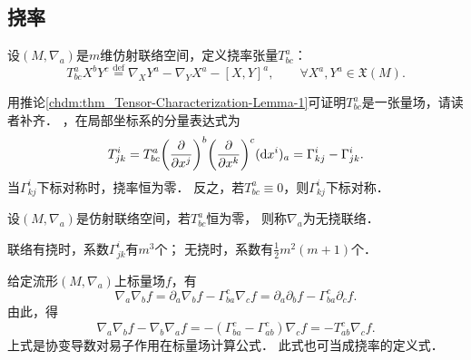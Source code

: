 \subsection{挠率}\label{chccr:sec_torsion}
\begin{definition}
    设$(M,\nabla_a)$是$m$维仿射联络空间，定义挠率张量$T_{bc}^a$：
    \begin{equation}\label{chccr:eqn_Ttorsion}
        T_{bc}^a{X^b}{Y^c} \overset{\mathrm {def}}{=} {\nabla _X}{Y^a} - {\nabla _Y}{X^a} - {\left[ {X,Y} \right]^a} ,
        \qquad \forall X^a, Y^a \in \mathfrak{X}(M) .
    \end{equation}
\end{definition}
用推论\ref{chdm:thm_Tensor-Characterization-Lemma-1}可证明$T_{bc}^a$是一张量场，请读者补齐．
，在局部坐标系的分量表达式为
\begin{equation}\label{chccr:eqn_Ttorsion-comp}
    T_{jk}^i=T_{bc}^a{\left(\frac{\partial}{\partial x^j}\right)^b}
    {\left(\frac{\partial}{\partial x^k}\right)^c}
    ({\rm d} x^i)_a = \Gamma^{i}_{kj} - \Gamma^{i}_{jk} .
\end{equation}
当$\Gamma^{i}_{kj}$下标对称时，挠率恒为零．
反之，若$T_{bc}^a\equiv 0$，则$\Gamma^{i}_{kj}$下标对称．
\begin{definition}
    设$(M,\nabla_a)$是仿射联络空间，若$T_{bc}^a$恒为零，
    则称$\nabla_a$为{\heiti 无挠联络}．
\end{definition}

\begin{remark}\label{chccr:remark_connection-coef-num}
    联络有挠时，系数$\Gamma^{i}_{jk}$有$m^3$个；
    无挠时，系数有$\frac{1}{2}m^2(m+1)$个．
\end{remark}


给定流形$(M,\nabla_a)$上标量场$f$，有
\begin{equation}
    \nabla_a\nabla_b f= \partial_a\nabla_b f - \Gamma_{ba}^c \nabla_c f
    = \partial_a\partial_b f - \Gamma_{ba}^c \partial_c f .
\end{equation}
由此，得
\begin{equation}\label{chccr:eqn_scalar-torsion}
    \nabla_a\nabla_b f - \nabla_b\nabla_a f=  - (\Gamma_{ba}^c-\Gamma_{ab}^c) \nabla_c f
    = - T_{ab}^c \nabla_c f .
\end{equation}
上式是协变导数对易子作用在标量场计算公式．
此式也可当成挠率的定义式．


